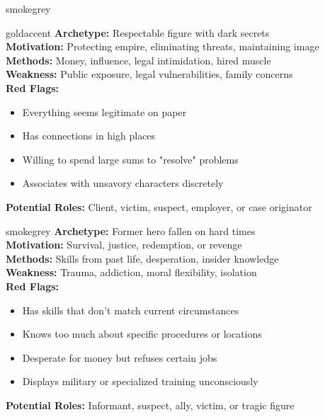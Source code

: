 \documentclass[11pt]{article}
\begin{document}
\begin{noirsection}{smokegrey}
\begin{suspectbox}{goldaccent}
\textbf{Archetype:} Respectable figure with dark secrets\\
\textbf{Motivation:} Protecting empire, eliminating threats, maintaining image\\
\textbf{Methods:} Money, influence, legal intimidation, hired muscle\\
\textbf{Weakness:} Public exposure, legal vulnerabilities, family concerns\\
\textbf{Red Flags:}
\begin{itemize}
    \item Everything seems legitimate on paper
    \item Has connections in high places
    \item Willing to spend large sums to "resolve" problems
    \item Associates with unsavory characters discretely
\end{itemize}
\textbf{Potential Roles:} Client, victim, suspect, employer, or case originator
\end{suspectbox}

\begin{suspectbox}{smokegrey}
\textbf{Archetype:} Former hero fallen on hard times\\
\textbf{Motivation:} Survival, justice, redemption, or revenge\\
\textbf{Methods:} Skills from past life, desperation, insider knowledge\\
\textbf{Weakness:} Trauma, addiction, moral flexibility, isolation\\
\textbf{Red Flags:}
\begin{itemize}
    \item Has skills that don't match current circumstances
    \item Knows too much about specific procedures or locations
    \item Desperate for money but refuses certain jobs
    \item Displays military or specialized training unconsciously
\end{itemize}
\textbf{Potential Roles:} Informant, suspect, ally, victim, or tragic figure
\end{suspectbox}


\end{noirsection}
\end{document}
